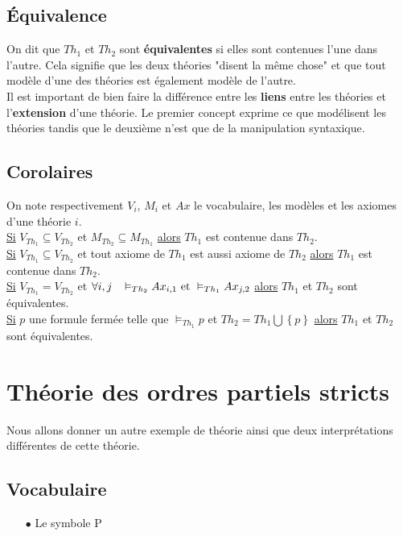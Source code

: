 \subsection*{Équivalence}
On dit que $Th_1$ et $Th_2$ sont \textbf{équivalentes} si elles sont contenues l'une dans l'autre. Cela signifie que les deux théories "disent la même chose" et que tout modèle d'une des théories est également modèle de l'autre.\\

Il est important de bien faire la différence entre les \textbf{liens} entre les théories et l'\textbf{extension} d'une théorie. Le premier concept exprime ce que modélisent les théories tandis que le deuxième n'est que de la manipulation syntaxique.

\subsection*{Corolaires}
On note respectivement $V_i$, $M_i$ et $Ax$ le vocabulaire, les modèles et les axiomes d'une théorie $i$. \\

\noindent \underline{Si} $V_{Th_1} \subseteq V_{Th_2}$ et $M_{Th_2} \subseteq M_{Th_1}$ \underline{alors} $Th_1$ est contenue dans $Th_2$. \\

\noindent \underline{Si} $V_{Th_1} \subseteq V_{Th_2}$ et tout axiome de $Th_1$ est aussi axiome de $Th_2$ \underline{alors} $Th_1$ est contenue dans $Th_2$. \\

\noindent \underline{Si} $V_{Th_1} = V_{Th_2}$ et $\forall i,j \hspace{0.3cm} \vDash_{Th_2} Ax_{i,1} \textrm{ et } \vDash_{Th_1} Ax_{j,2} $ \underline{alors} $Th_1$ et $Th_2$ sont équivalentes. \\

\noindent \underline{Si} $p$ une formule fermée telle que $\vDash_{Th_1} p$ et $Th_2 = Th_1 \bigcup \left\lbrace p \right\rbrace$ \underline{alors} $Th_1$ et $Th_2$ sont équivalentes. \\

\section{Théorie des ordres partiels stricts}

Nous allons donner un autre exemple de théorie ainsi que deux interprétations différentes de cette théorie.
\subsection*{Vocabulaire}
\begin{itemize}
\item[$\bullet$] Le symbole P
\end{itemize}
